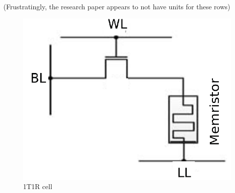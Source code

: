 \documentclass{sig-alternate}
\begin{document}
(Frustratingly, the research paper appears to not have units for these rows)



\begin{figure}
  \includegraphics[scale=.29]{1t1real.png}
  \caption{1T1R cell}
  \label{fig:crossSwitch}
\end{figure}
\end{document}
